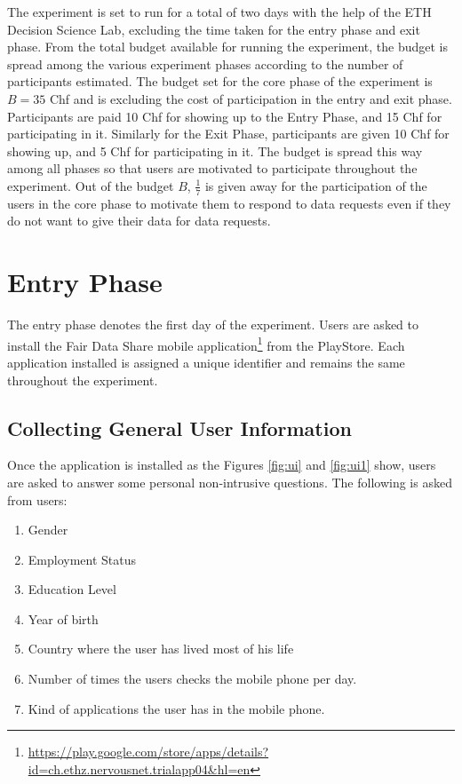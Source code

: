 The experiment is set to run for a total of two days with the help of the ETH Decision Science Lab, excluding the time taken for the entry phase and exit phase. From the total budget available for running the experiment, the budget is spread among the various experiment phases according to the number of participants estimated. The budget set for the core phase of the experiment is $B=35$ Chf and is excluding the cost of participation
in the entry and exit phase. Participants are paid 10 Chf for showing up to the Entry Phase, and 15 Chf for
participating in it. Similarly for the Exit Phase, participants are given 10 Chf for showing up, and 5 Chf for participating in it. The budget is spread this way among all phases so that users are motivated to participate throughout the experiment.
Out of the budget $B$, $\frac{1}{7}$ is given away for the participation of the users in the core phase to motivate them to respond to data requests even if they do not want to give their data for data requests. 

\section{Entry Phase}

The entry phase denotes the first day of the experiment. Users are asked to install the Fair Data Share mobile application\footnote{\url{https://play.google.com/store/apps/details?id=ch.ethz.nervousnet.trialapp04&hl=en}} from the PlayStore. Each application installed is assigned a unique identifier and remains the same throughout the experiment. 

\subsection{Collecting General User Information}
Once the application is installed as the Figures \ref{fig:ui} and \ref{fig:ui1} show, users are asked to answer some personal non-intrusive questions. The following is asked from users: 
\begin{enumerate}
    \item Gender
    \item Employment Status
    \item Education Level
    \item Year of birth
    \item Country where the user has lived most of his life
    \item Number of times the users checks the mobile phone per day.
    \item Kind of applications the user has in the mobile phone.
\end{enumerate}


